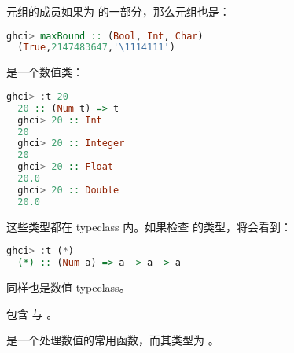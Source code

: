 \documentclass[./main.tex]{subfiles}
\begin{document}
元组的成员如果为  的一部分，那么元组也是：

\begin{lstlisting}[language=Haskell]
  ghci> maxBound :: (Bool, Int, Char)
  (True,2147483647,'\1114111')
\end{lstlisting}

 是一个数值类：

\begin{lstlisting}[language=Haskell]
  ghci> :t 20
  20 :: (Num t) => t
  ghci> 20 :: Int
  20
  ghci> 20 :: Integer
  20
  ghci> 20 :: Float
  20.0
  ghci> 20 :: Double
  20.0
\end{lstlisting}

这些类型都在  typeclass 内。如果检查 \acode{*} 的类型，将会看到：

\begin{lstlisting}[language=Haskell]
  ghci> :t (*)
  (*) :: (Num a) => a -> a -> a
\end{lstlisting}

 同样也是数值 typeclass。

 包含  与 。

 是一个处理数值的常用函数，而其类型为 。
\end{document}
